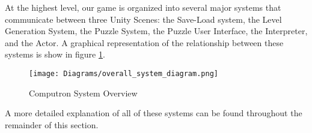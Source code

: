 At the highest level, our game is organized into several major systems that communicate between three Unity Scenes: the Save-Load system, the Level Generation System, the Puzzle System, the Puzzle User Interface, the Interpreter, and the Actor. A graphical representation of the relationship between these systems is show in figure \ref{fig:overall_system_diagram}.

\begin{figure}[!hb]
    \caption{Computron System Overview}
    \label{fig:overall_system_diagram}
    \centering
    \texttt{[image: Diagrams/overall\_system\_diagram.png]}
\end{figure}

A more detailed explanation of all of these systems can be found throughout the remainder of this section.